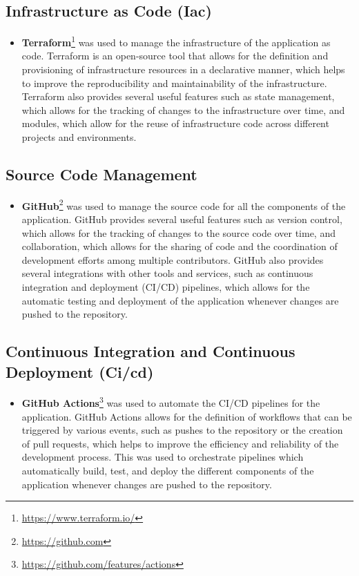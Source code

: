 \subsection{Infrastructure as Code (Iac)}\label{subsec:infrastructure_as_code}
\begin{itemize}
    \item \textbf{Terraform}\footnote{\url{https://www.terraform.io/}} was used to manage the infrastructure of the application as code.
    Terraform is an open-source tool that allows for the definition and provisioning of infrastructure resources in a declarative manner, which helps to improve the reproducibility and maintainability of the infrastructure.
    Terraform also provides several useful features such as state management, which allows for the tracking of changes to the infrastructure over time, and modules, which allow for the reuse of infrastructure code across different projects and environments.
\end{itemize}

\subsection{Source Code Management}\label{subsec:source_code_management}
\begin{itemize}
    \item \textbf{GitHub}\footnote{\url{https://github.com}} was used to manage the source code for all the components of the application.
    GitHub provides several useful features such as version control, which allows for the tracking of changes to the source code over time, and collaboration, which allows for the sharing of code and the coordination of development efforts among multiple contributors.
    GitHub also provides several integrations with other tools and services, such as continuous integration and deployment (CI/CD) pipelines, which allows for the automatic testing and deployment of the application whenever changes are pushed to the repository.
\end{itemize}

\subsection{Continuous Integration and Continuous Deployment (Ci/cd)}\label{subsec:ci_cd}
\begin{itemize}
    \item \textbf{GitHub Actions}\footnote{\url{https://github.com/features/actions}} was used to automate the CI/CD pipelines for the application.
    GitHub Actions allows for the definition of workflows that can be triggered by various events, such as pushes to the repository or the creation of pull requests, which helps to improve the efficiency and reliability of the development process.
    This was used to orchestrate pipelines which automatically build, test, and deploy the different components of the application whenever changes are pushed to the repository.
\end{itemize}

